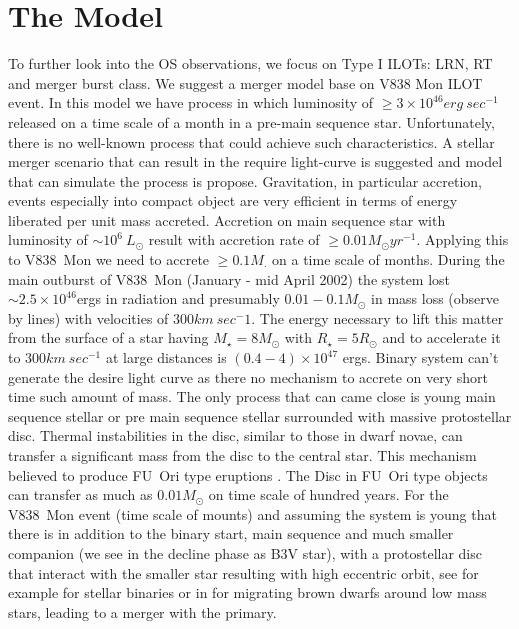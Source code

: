 \documentclass[a4paper,12pt,modern]{aastex62}
\begin{document}
\section{The Model}
To further look into the OS observations, we focus on Type I ILOTs: LRN, RT and merger burst class. We suggest a merger model base on V838 Mon ILOT \cite{2006A&A...451..223T} event.
In this model we have process in which luminosity of $\geq 3\times10^{46}erg~sec^{-1}$ released on a time scale of a month in a pre-main sequence star. 
Unfortunately, there is no well-known process that could achieve such characteristics.
A stellar merger scenario that can result in the require light-curve is suggested and model that can simulate the process is propose.
Gravitation, in particular accretion, events especially into compact object are very efficient in terms of energy liberated per unit mass accreted.
Accretion on main sequence star with luminosity of $\sim 10^6 ~ L_{\odot}$ result with accretion rate of $\geq 0.01M_{\odot}yr^{-1}$.
Applying this to V838~Mon we need to accrete $\geq 0.1 M_\cdot$ on a time scale of months.
During the main outburst of V838~Mon (January - mid April 2002) the system lost $\sim2.5\times10^{46}$ergs in radiation and presumably $0.01-0.1 M_\odot$ in mass loss (observe by lines) with velocities of $300km~sec^-1$.
The energy necessary to lift this matter from the surface of a star having $M_{\star}=8M_\odot$ with $R_{\star}=5R_\odot$ and to accelerate it to $300km~sec^{-1}$ at large distances is $(0.4-4)\times 10^{47}$ ergs.
Binary system can't generate the desire light curve as there no mechanism to accrete on very short time such amount of mass.
The only process that can came close is young main sequence stellar or pre main sequence stellar surrounded with massive protostellar disc.
Thermal instabilities in the disc, similar to those in dwarf novae, can transfer a significant mass from the disc to the central star.
This mechanism believed to produce FU~Ori type eruptions \cite{1996ARA&A..34..207H}.
The Disc in FU~Ori type objects can transfer as much as $0.01M_\odot$ on time scale of hundred years.
For the V838~Mon event (time scale of mounts) and assuming the system is young that there is in addition to the binary start, main sequence and much smaller companion (we see in the decline phase as B3V star), with a protostellar disc that interact with the smaller star resulting with high eccentric orbit, see for example \cite{1991ApJ...370L..35A} for stellar binaries or in \cite{2002MNRAS.330L..11A} for migrating brown dwarfs around low mass stars, leading to a merger with the primary.
\end{document}
